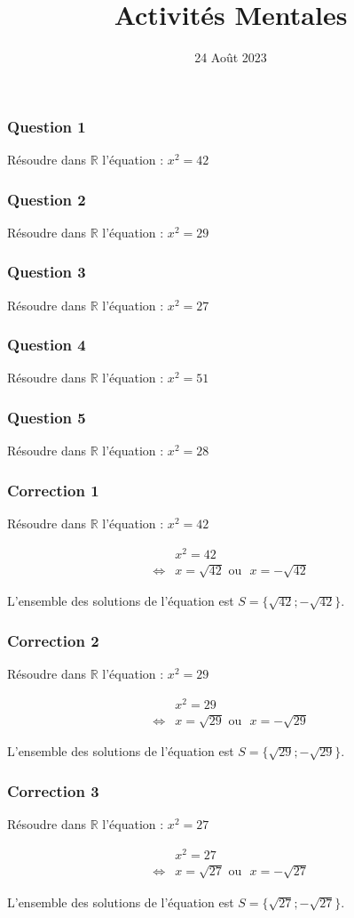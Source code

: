 \documentclass[15pt, mathserif]{beamer}
\title{Activités Mentales}
\date{24 Août 2023}
\newcommand{\R}{\mathbb{R}}			%
\begin{document}
\begin{frame}
    \titlepage
\end{frame}

\begin{frame} 
	\frametitle{Question 1}
Résoudre dans $\R$ l'équation : $x^2=42$\end{frame}


\begin{frame} 
	\frametitle{Question 2}
Résoudre dans $\R$ l'équation : $x^2=29$\end{frame}


\begin{frame} 
	\frametitle{Question 3}
Résoudre dans $\R$ l'équation : $x^2=27$\end{frame}


\begin{frame} 
	\frametitle{Question 4}
Résoudre dans $\R$ l'équation : $x^2=51$\end{frame}


\begin{frame} 
	\frametitle{Question 5}
Résoudre dans $\R$ l'équation : $x^2=28$\end{frame}


\begin{frame}
\vspace{-10mm}
	\frametitle{Correction 1}
Résoudre dans $\R$ l'équation : $x^2=42$
 
 \begin{align*} 
 & x^2=42 \\ \Leftrightarrow & x=\sqrt{42} \text{~ou ~} x=-\sqrt{42} 
 \end{align*} 
 
 L'ensemble des solutions de l'équation est $S=\{\sqrt{42} ;-\sqrt{42} \}$. \end{frame}


\begin{frame}
\vspace{-10mm}
	\frametitle{Correction 2}
Résoudre dans $\R$ l'équation : $x^2=29$
 
 \begin{align*} 
 & x^2=29 \\ \Leftrightarrow & x=\sqrt{29} \text{~ou ~} x=-\sqrt{29} 
 \end{align*} 
 
 L'ensemble des solutions de l'équation est $S=\{\sqrt{29} ;-\sqrt{29} \}$. \end{frame}


\begin{frame}
\vspace{-10mm}
	\frametitle{Correction 3}
Résoudre dans $\R$ l'équation : $x^2=27$
 
 \begin{align*} 
 & x^2=27 \\ \Leftrightarrow & x=\sqrt{27} \text{~ou ~} x=-\sqrt{27} 
 \end{align*} 
 
 L'ensemble des solutions de l'équation est $S=\{\sqrt{27} ;-\sqrt{27} \}$. \end{frame}
\end{document}
